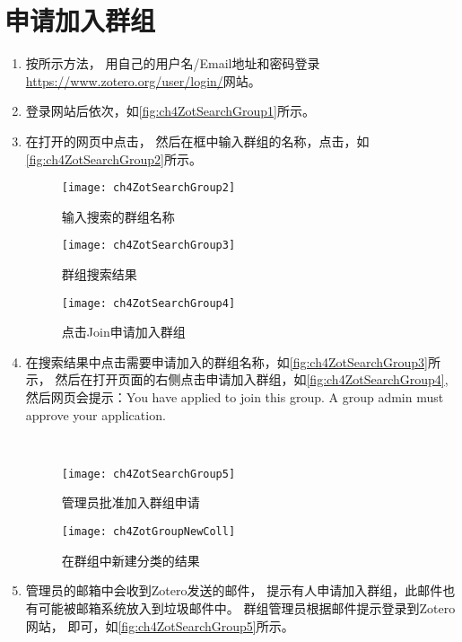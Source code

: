 \documentclass[cn,11pt,chinese]{elegantbook}
\begin{document}
\section{申请加入群组}\label{sec:joinGroup}
\begin{enumerate}
	\item 按所示方法，
	用自己的用户名/Email地址和密码登录\url{https://www.zotero.org/user/login/}网站。
	\item 登录网站后依次，如\autoref{fig:ch4ZotSearchGroup1}所示。
	\item 在打开的网页中点击，
	然后在框中输入群组的名称，点击，如\autoref{fig:ch4ZotSearchGroup2}所示。
	
	
	\begin{figure}[t]
		\begin{minipage}[b]{\dimexpr.3\textwidth-1em}
			\centering
			\texttt{[image: ch4ZotSearchGroup2]}
			\caption{输入搜索的群组名称}
			\label{fig:ch4ZotSearchGroup2}
		\end{minipage}
		\begin{minipage}[b]{\dimexpr.3\textwidth-1em}
			\centering
			\texttt{[image: ch4ZotSearchGroup3]}
			\caption{群组搜索结果}
			\label{fig:ch4ZotSearchGroup3}
		\end{minipage}
		\begin{minipage}[b]{\dimexpr.4\textwidth-1em}
			\centering
			\texttt{[image: ch4ZotSearchGroup4]}
			\caption{点击Join申请加入群组}
			\label{fig:ch4ZotSearchGroup4}
		\end{minipage}
	
	\end{figure}
	\item 在搜索结果中点击需要申请加入的群组名称，如\autoref{fig:ch4ZotSearchGroup3}所示，
	然后在打开页面的右侧点击申请加入群组，如\autoref{fig:ch4ZotSearchGroup4},
	然后网页会提示：You have applied to join this group. A group admin must approve your application.
		\begin{figure}[htbp]
			\centering\
			\begin{minipage}[t]{0.6\linewidth}
				\centering
				\texttt{[image: ch4ZotSearchGroup5]}
				\caption{管理员批准加入群组申请}
				\label{fig:ch4ZotSearchGroup5}
			\end{minipage}
			\begin{minipage}[t]{0.3\linewidth}
				\centering
				\texttt{[image: ch4ZotGroupNewColl]}
				\caption{在群组中新建分类的结果}
				\label{fig:ch4ZotGroupNewColl}
			\end{minipage}
		\end{figure}

	\item 管理员的邮箱中会收到Zotero发送的邮件，
	提示有人申请加入群组，此邮件也有可能被邮箱系统放入到垃圾邮件中。
	群组管理员根据邮件提示登录到Zotero网站，
	即可，如\autoref{fig:ch4ZotSearchGroup5}所示。

\end{enumerate}
\end{document}

